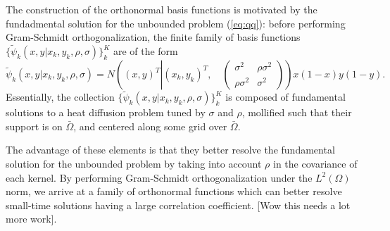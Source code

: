 \documentclass[10pt]{article}
\begin{document}
The construction of the orthonormal basis functions is motivated by
the fundadmental solution for the unbounded problem (\ref{eq:qq}):
before performing Gram-Schmidt orthogonalization, the finite family of
basis functions
$\{ \tilde{\psi}_k(x,y| x_k, y_k, \rho, \sigma) \}_{k}^K$ are of the
form
\[
  \tilde{\psi}_k(x,y| x_k, y_k, \rho, \sigma) = N\left( (x,y)^T \left|
      (x_k, y_k)^T , \quad \left( \begin{array}{cc}
                                     \sigma^2 & \rho \sigma^2 \\
                                     \rho \sigma^2 & \sigma^2
                     \end{array} \right) \right. \right) x(1-x)y(1-y).
\]
Essentially, the collection
$\{ \tilde{\psi}_k(x,y| x_k, y_k, \rho, \sigma) \}_{k}^K$ is composed
of fundamental solutions to a heat diffusion problem tuned by $\sigma$
and $\rho$, mollified such that their support is on $\bar{\Omega}$,
and centered along some grid over $\bar{\Omega}$.

The advantage of these elements is that they better resolve the
fundamental solution for the unbounded problem by taking into account
$\rho$ in the covariance of each kernel. By performing Gram-Schmidt
orthogonalization under the $L^2(\Omega)$ norm, we arrive at a family
of orthonormal functions which can better resolve small-time solutions
having a large correlation coefficient. [Wow this needs a lot more
work].

\end{document}
